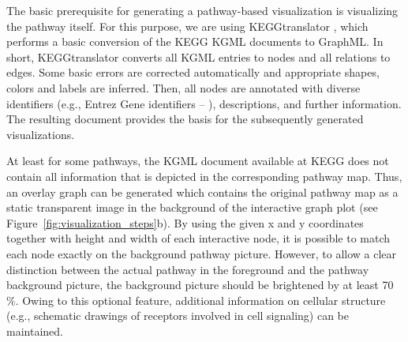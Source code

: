 \documentclass{bioinfo}
\begin{document}
The basic prerequisite for generating a pathway-based visualization is visualizing the pathway
itself. For this purpose, we are using KEGGtranslator \citep[see][]{Wrzodek2011}, which performs a
basic conversion of the KEGG KGML documents to GraphML. In short, KEGGtranslator converts all KGML entries to nodes
and all relations to edges. Some basic errors are corrected automatically and appropriate shapes,
colors and labels are inferred. Then, all nodes are annotated with diverse identifiers (e.g., Entrez Gene
identifiers -- \citealp{EntrezGene}),
descriptions, and further information. The resulting document provides the basis for the
subsequently generated visualizations.

%

At least for some pathways, the KGML document available at KEGG does not contain all information
that is depicted in the corresponding pathway map. Thus, an overlay graph can be generated which contains the
original pathway map as a static transparent image in the background of the interactive graph plot
(see Figure~\ref{fig:visualization_steps}b). By using the given x and y coordinates together with height and width of each interactive node, it is possible
to match each node exactly on the background pathway picture. However, to allow a clear distinction between the actual pathway in the foreground and the pathway background picture, the background picture should be brightened by at least 70\,\%.
Owing to this optional feature, additional information on
cellular structure (e.g., schematic drawings of receptors involved in cell signaling) can be maintained.


\end{document}
